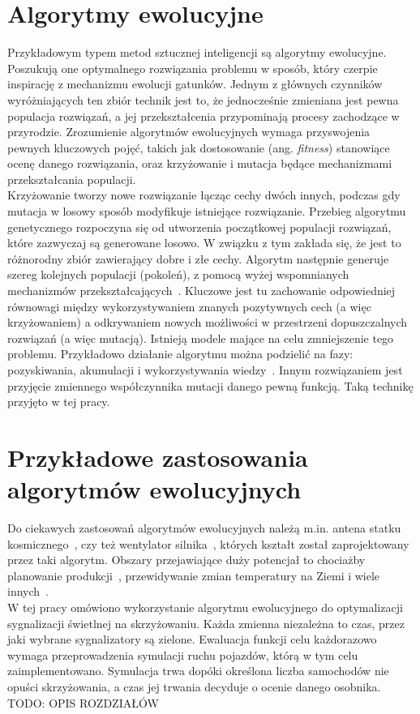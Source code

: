 \section*{Algorytmy ewolucyjne} Przykładowym typem metod sztucznej inteligencji są algorytmy ewolucyjne. Poszukują one optymalnego rozwiązania problemu w sposób, który czerpie inspirację z mechanizmu ewolucji gatunków. Jednym z głównych czynników wyróżniających ten zbiór technik jest to, że jednocześnie zmieniana jest pewna populacja rozwiązań, a jej przekształcenia przypominają procesy zachodzące w przyrodzie. Zrozumienie algorytmów ewolucyjnych wymaga przyswojenia pewnych kluczowych pojęć, takich jak dostosowanie (ang. \textit{fitness}) stanowiące ocenę danego rozwiązania, oraz krzyżowanie i mutacja będące mechanizmami przekształcania populacji. \\Krzyżowanie tworzy nowe rozwiązanie łącząc cechy dwóch innych, podczas gdy mutacja w losowy sposób modyfikuje istniejące rozwiązanie. 
Przebieg algorytmu genetycznego rozpoczyna się od utworzenia początkowej populacji rozwiązań, które zazwyczaj są generowane losowo. W związku z tym zakłada się, że jest to różnorodny zbiór zawierający dobre i złe cechy.
Algorytm następnie generuje szereg kolejnych populacji (pokoleń), z pomocą wyżej wspomnianych mechanizmów przekształcających~\cite{Cohoon:2003:EAP:903758.903786}. Kluczowe jest tu zachowanie odpowiedniej równowagi między wykorzystywaniem znanych pozytywnych cech (a więc krzyżowaniem) a odkrywaniem nowych możliwości w przestrzeni dopuszczalnych rozwiązań (a więc mutacją). Istnieją modele mające na celu zmniejszenie tego problemu. Przykładowo działanie algorytmu można podzielić na fazy: pozyskiwania, akumulacji i wykorzystywania wiedzy~\cite{10.1371/journal.pone.0095693}. Innym rozwiązaniem jest przyjęcie zmiennego współczynnika mutacji danego pewną funkcją. Taką technikę przyjęto w tej pracy. 
\section*{Przykładowe zastosowania algorytmów ewolucyjnych} Do ciekawych zastosowań algorytmów ewolucyjnych należą m.in. antena statku kosmicznego~\cite{Lohn2006AutomatedAD}, czy też wentylator silnika~\cite{article}, których kształt został zaprojektowany przez taki algorytm. Obszary przejawiające duży potencjał to chociażby planowanie produkcji~\cite{Wall:1996:GAR:925320}, przewidywanie zmian temperatury na Ziemi\cite{Stanislawska:2012:MGT:2400749.2401077} i wiele innych~\cite{Steinbuch2010}.\\
W tej pracy omówiono wykorzystanie algorytmu ewolucyjnego do optymalizacji sygnalizacji świetlnej na skrzyżowaniu. Każda zmienna niezależna to czas, przez jaki wybrane sygnalizatory są zielone. Ewaluacja funkcji celu każdorazowo wymaga przeprowadzenia symulacji ruchu pojazdów, którą w tym celu zaimplementowano. Symulacja trwa dopóki określona liczba samochodów nie opuści skrzyżowania, a czas jej trwania decyduje o ocenie danego osobnika. 
{\Huge TODO: OPIS ROZDZIAŁÓW}
